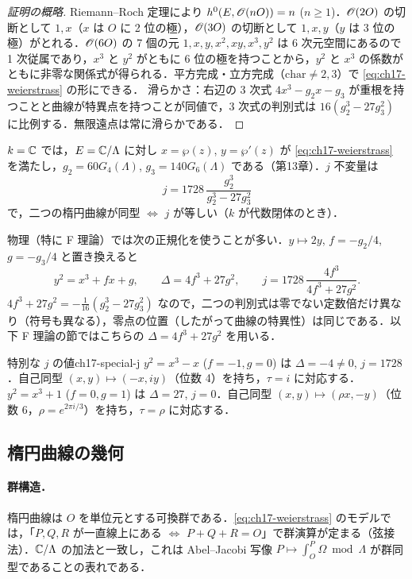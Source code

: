 \begin{proof}[証明の概略]
Riemann--Roch 定理により $h^0(E,\mathscr{O}(nO))=n$ ($n\ge1$)．$\mathscr{O}(2O)$ の切断として $1,x$（$x$ は $O$ に 2 位の極），$\mathscr{O}(3O)$ の切断として $1,x,y$（$y$ は 3 位の極）がとれる．$\mathscr{O}(6O)$ の 7 個の元 $1,x,y,x^2,xy,x^3,y^2$ は 6 次元空間にあるので 1 次従属であり，$x^3$ と $y^2$ がともに 6 位の極を持つことから，$y^2$ と $x^3$ の係数がともに非零な関係式が得られる．平方完成・立方完成（$\mathrm{char}\neq2,3$）で \eqref{eq:ch17-weierstrass} の形にできる．
滑らかさ：右辺の 3 次式 $4x^3-g_2x-g_3$ が重根を持つことと曲線が特異点を持つことが同値で，3 次式の判別式は $16(g_2^3-27g_3^2)$ に比例する．無限遠点は常に滑らかである．
\end{proof}

$k=\mathbb{C}$ では，$E=\mathbb{C}/\Lambda$ に対し $x=\wp(z)$, $y=\wp'(z)$ が \eqref{eq:ch17-weierstrass} を満たし，$g_2=60G_4(\Lambda)$, $g_3=140G_6(\Lambda)$ である（第13章）．$j$ 不変量は
\begin{equation}
j=1728\,\frac{g_2^3}{g_2^3-27g_3^2}
\label{eq:ch17-j}
\end{equation}
で，二つの楕円曲線が同型 $\iff$ $j$ が等しい（$k$ が代数閉体のとき）．

物理（特に F 理論）では次の正規化を使うことが多い．$y\mapsto 2y$, $f=-g_2/4$, $g=-g_3/4$ と置き換えると
\begin{equation}
y^2=x^3+fx+g,\qquad \Delta=4f^3+27g^2,\qquad j=1728\,\frac{4f^3}{4f^3+27g^2}.
\label{eq:ch17-weierstrass-fg}
\end{equation}
$4f^3+27g^2=-\tfrac1{16}(g_2^3-27g_3^2)$ なので，二つの判別式は零でない定数倍だけ異なり（符号も異なる），零点の位置（したがって曲線の特異性）は同じである．以下 F 理論の節ではこちらの $\Delta=4f^3+27g^2$ を用いる．

\begin{myex}{特別な $j$ の値}{ch17-special-j}
$y^2=x^3-x$ ($f=-1,g=0$) は $\Delta=-4\ne0$, $j=1728$．自己同型 $(x,y)\mapsto(-x,iy)$（位数 4）を持ち，$\tau=i$ に対応する．
$y^2=x^3+1$ ($f=0,g=1$) は $\Delta=27$, $j=0$．自己同型 $(x,y)\mapsto(\rho x,-y)$（位数 6，$\rho=e^{2\pi i/3}$）を持ち，$\tau=\rho$ に対応する．
\end{myex}

\subsection{楕円曲線の幾何}

\paragraph{群構造．}
楕円曲線は $O$ を単位元とする可換群である．\eqref{eq:ch17-weierstrass} のモデルでは，「$P,Q,R$ が一直線上にある $\iff$ $P+Q+R=O$」で群演算が定まる（弦接法）．$\mathbb{C}/\Lambda$ の加法と一致し，これは Abel--Jacobi 写像 $P\mapsto\int_O^P\Omega\bmod\Lambda$ が群同型であることの表れである．

